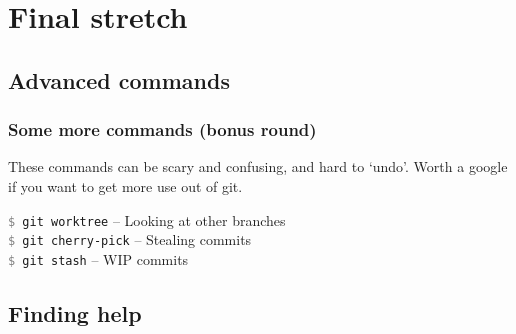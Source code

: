\documentclass{beamer}
\newcommand{\command}[1]{\texttt{\textcolor{gray}{\$} {#1}}}
\begin{document}
\section{Final stretch}
\subsection{Advanced commands}

\begin{frame}[fragile]
  \frametitle{Some more commands (bonus round)}
  These commands can be scary and confusing, and hard to `undo'. Worth a google if you
  want to get more use out of git.
  \vspace{1em}
  
  \command{git worktree} -- Looking at other branches \\
  \command{git cherry-pick} -- Stealing commits \\
  \command{git stash} -- WIP commits \\
    
\end{frame}

\subsection{Finding help}
\end{document}
